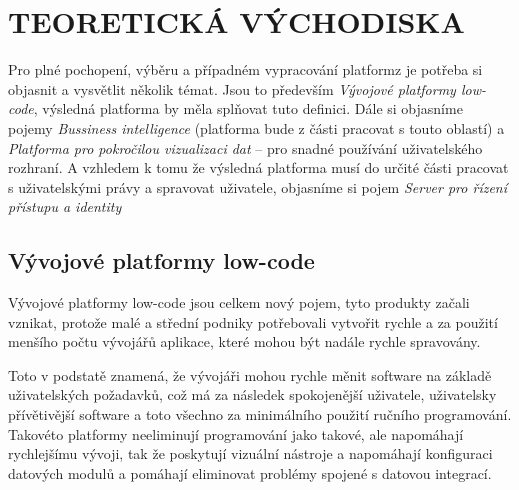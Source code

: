 \chapter{TEORETICKÁ VÝCHODISKA}
\par Pro plné pochopení, výběru a případném vypracování platformz je potřeba si objasnit a vysvětlit několik témat. Jsou to především \textit{Vývojové platformy low-code}, výsledná platforma by měla splňovat tuto definici. Dále si objasníme pojemy \textit{Bussiness intelligence} (platforma bude z části pracovat s touto oblastí) a \textit{Platforma pro pokročilou vizualizaci dat} -- pro snadné používání uživatelského rozhraní. A vzhledem k tomu že výsledná platforma musí do určité části pracovat s uživatelskými právy a spravovat uživatele, objasníme si pojem \textit{Server pro řízení přístupu a identity}

\section{Vývojové platformy low-code}
\par Vývojové platformy low-code jsou celkem nový pojem, tyto produkty začali vznikat, protože malé a střední podniky potřebovali vytvořit rychle a za použití menšího počtu vývojářů aplikace, které mohou být nadále rychle spravovány. \cite{pcmag-no-coding}

\par Toto v podstatě znamená, že vývojáři mohou rychle měnit software na základě uživatelských požadavků, což má za následek spokojenější uživatele, uživatelsky přívětivější software a toto všechno za minimálního použití ručního programování. Takovéto platformy neeliminují programování jako takové, ale napomáhají rychlejšímu vývoji, tak že poskytují vizuální nástroje a napomáhají konfiguraci datových modulů a pomáhají eliminovat problémy spojené s  datovou integrací. \cite{low-code-customer-want}

